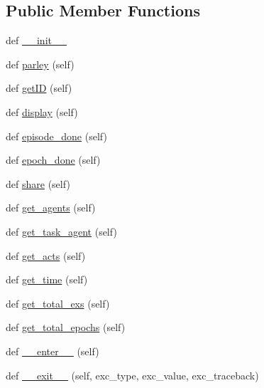 \subsection*{Public Member Functions}
\begin{DoxyCompactItemize}
\item 
def \hyperlink{classparlai_1_1core_1_1worlds_1_1World_a6e346d06369a49c753f568b7694c9439}{\+\_\+\+\_\+init\+\_\+\+\_\+}
\item 
def \hyperlink{classparlai_1_1core_1_1worlds_1_1World_ac7e23e08adad68116e72162cd419786b}{parley} (self)
\item 
def \hyperlink{classparlai_1_1core_1_1worlds_1_1World_a5ef8bd0bc50edb86ef87e4a3e72b6192}{get\+ID} (self)
\item 
def \hyperlink{classparlai_1_1core_1_1worlds_1_1World_a147371097765449933ca963215eba603}{display} (self)
\item 
def \hyperlink{classparlai_1_1core_1_1worlds_1_1World_aaaef76f5bae4cdbe8f78241f8cd7c3a3}{episode\+\_\+done} (self)
\item 
def \hyperlink{classparlai_1_1core_1_1worlds_1_1World_aa8a3ab5345bbfa1d485dec974ed28b53}{epoch\+\_\+done} (self)
\item 
def \hyperlink{classparlai_1_1core_1_1worlds_1_1World_a08d9212397f136cbc52ee224bcb0bc4e}{share} (self)
\item 
def \hyperlink{classparlai_1_1core_1_1worlds_1_1World_a1c74e607d064c5823e56b23b21ce17f0}{get\+\_\+agents} (self)
\item 
def \hyperlink{classparlai_1_1core_1_1worlds_1_1World_a25ccd7740aa992bb7055bf6549574a07}{get\+\_\+task\+\_\+agent} (self)
\item 
def \hyperlink{classparlai_1_1core_1_1worlds_1_1World_aa1d3c0cc946f5ade27373f7dc0bd77b5}{get\+\_\+acts} (self)
\item 
def \hyperlink{classparlai_1_1core_1_1worlds_1_1World_a621ed405ee96d67bc4bab781145a3daa}{get\+\_\+time} (self)
\item 
def \hyperlink{classparlai_1_1core_1_1worlds_1_1World_a0f9926a92069bfb833a6c4a531d99b70}{get\+\_\+total\+\_\+exs} (self)
\item 
def \hyperlink{classparlai_1_1core_1_1worlds_1_1World_acf90b0f1a9ec1314b905159559b4d4ab}{get\+\_\+total\+\_\+epochs} (self)
\item 
def \hyperlink{classparlai_1_1core_1_1worlds_1_1World_a714433529a05cc3862ad3b8ade4628f7}{\+\_\+\+\_\+enter\+\_\+\+\_\+} (self)
\item 
def \hyperlink{classparlai_1_1core_1_1worlds_1_1World_ae2b8ea006564cbefbe8520f45fb71040}{\+\_\+\+\_\+exit\+\_\+\+\_\+} (self, exc\+\_\+type, exc\+\_\+value, exc\+\_\+traceback)

\end{DoxyCompactItemize}
